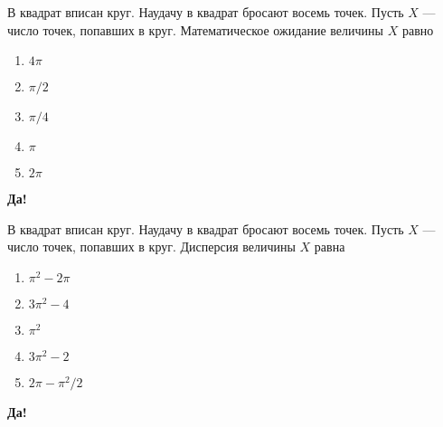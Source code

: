 \documentclass[t]{beamer}
\begin{document}
 \begin{frame} \label{8-Yes} 
\begin{block}{8} 

В квадрат вписан круг. Наудачу в квадрат бросают восемь точек. Пусть $X$ — число точек, попавших в круг. Математическое ожидание величины $X$ равно
     


 \end{block} 
\begin{enumerate} 
\item[] \hyperlink{8-No}{\beamergotobutton{} $4 \pi$
}
\item[] \hyperlink{8-No}{\beamergotobutton{} $\pi / 2$}
\item[] \hyperlink{8-No}{\beamergotobutton{} $\pi / 4$}
\item[] \hyperlink{8-No}{\beamergotobutton{} $\pi$}
\item[] \hyperlink{8-Yes}{\beamergotobutton{} $2\pi$}
\end{enumerate} 

 \textbf{Да!} 
 \hyperlink{9}{}\end{frame} 


 \begin{frame} \label{9-Yes} 
\begin{block}{9} 

В квадрат вписан круг. Наудачу в квадрат бросают восемь точек. Пусть $X$ — число точек, попавших в круг. Дисперсия величины $X$ равна     


 \end{block} 
\begin{enumerate} 
\item[] \hyperlink{9-No}{\beamergotobutton{} $\pi^2 - 2 \pi$}
\item[] \hyperlink{9-No}{\beamergotobutton{} $3\pi^2 - 4$}
\item[] \hyperlink{9-No}{\beamergotobutton{} $\pi^2$}
\item[] \hyperlink{9-No}{\beamergotobutton{} $3\pi^2 - 2$
}
\item[] \hyperlink{9-Yes}{\beamergotobutton{} $2\pi - \pi^2 / 2$}
\end{enumerate} 

 \textbf{Да!} 
 \hyperlink{10}{}\end{frame} 
\end{document}
